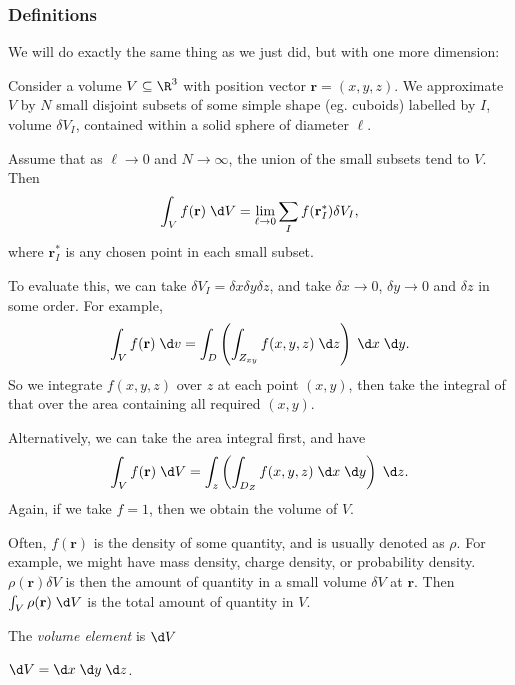 \documentclass[a4paper]{article}
\begin{document}
\subsubsection{Definitions}
We will do exactly the same thing as we just did, but with one more dimension:
\begin{defi}
  Consider a volume $V\subseteq \R^3$ with position vector $\mathbf{r} = (x, y, z)$. We approximate $V$ by $N$ small disjoint subsets of some simple shape (eg. cuboids) labelled by $I$, volume $\delta V_I$, contained within a solid sphere of diameter $\ell$.

  Assume that as $\ell \to 0$ and $N\to \infty$, the union of the small subsets tend to $V$. Then
  \[
    \int_V f(\mathbf{r})\;\d V = \lim_{\ell \to 0} \sum_{I}f(\mathbf{r}_I^*) \delta V_I,
  \]
  where $\mathbf{r}_I^*$ is any chosen point in each small subset.
\end{defi}
To evaluate this, we can take $\delta V_I = \delta x \delta y \delta z$, and take $\delta x\to 0$, $\delta y\to 0$ and $\delta z$ in some order. For example, 
\[
  \int_V f(\mathbf{r})\;\d v = \int_D \left(\int_{Z_{xy}}f(x, y, z)\;\d z\right)\;\d x\;\d y.
\]
So we integrate $f(x, y, z)$ over $z$ at each point $(x, y)$, then take the integral of that over the area containing all required $(x, y)$.

Alternatively, we can take the area integral first, and have
\[
  \int_V f(\mathbf{r})\;\d V = \int_z\left(\int_{D_Z} f(x, y, z)\;\d x\;\d y\right)\;\d z.
\]
Again, if we take $f = 1$, then we obtain the volume of $V$.

Often, $f(\mathbf{r})$ is the density of some quantity, and is usually denoted as $\rho$. For example, we might have mass density, charge density, or probability density. $\rho(\mathbf{r})\delta V$ is then the amount of quantity in a small volume $\delta V$ at $\mathbf{r}$. Then $\int_V \rho(\mathbf{r}) \;\d V$ is the total amount of quantity in $V$.

\begin{defi}
  The \emph{volume element} is $\d V$
\end{defi}

\begin{prop}
  $\d V = \d x\; \d y\; \d z$.
\end{prop}
\end{document}
